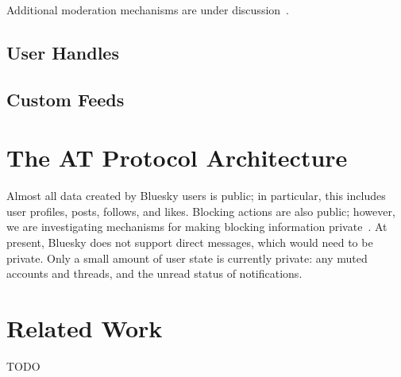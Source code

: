 \documentclass[sigconf,review]{acmart}
\begin{document}
Additional moderation mechanisms are under discussion~\cite{Moderation}.

\subsection{User Handles}\label{sec:handles}

\subsection{Custom Feeds}\label{sec:feeds}

\cite{AlgorithmicChoice}

\section{The AT Protocol Architecture}\label{sec:architecture}

Almost all data created by Bluesky users is public; in particular, this includes user profiles, posts, follows, and likes.
Blocking actions are also public; however, we are investigating mechanisms for making blocking information private~\cite{PrivateBlocks}.
At present, Bluesky does not support direct messages, which would need to be private.
Only a small amount of user state is currently private: any muted accounts and threads, and the unread status of notifications.



\section{Related Work}\label{sec:related-work}





\begin{acks}
TODO
\end{acks}



\end{document}
